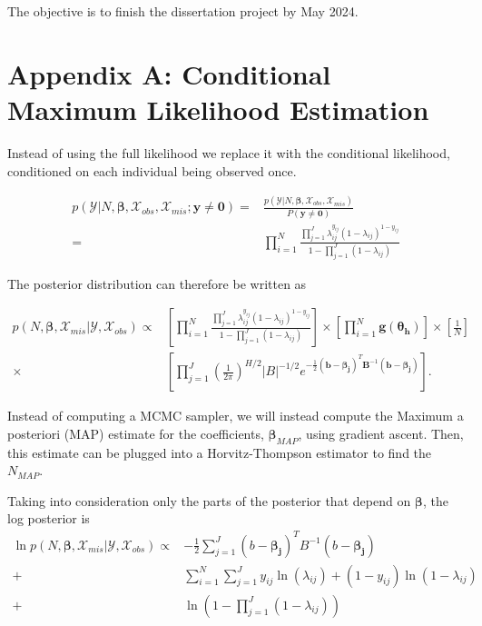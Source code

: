 \documentclass[
  12pt,
]{article}
\begin{document}
The objective is to finish the dissertation project by May 2024.

\newpage

\section{Appendix A: Conditional Maximum Likelihood Estimation}

\label{Sec:conditionalmaximumlike}

Instead of using the full likelihood we replace it with the conditional
likelihood, conditioned on each individual being observed once.

\begin{align}
\nonumber p(\mathcal{Y}|N,\boldsymbol{\beta},\mathcal{X}_{obs},\mathcal{X}_{mis};\boldsymbol{y}\ne \boldsymbol{0}) = & \frac{p(\mathcal{Y}|N,\boldsymbol{\beta},\mathcal{X}_{obs},\mathcal{X}_{mis})}{P(\boldsymbol{y}\ne \boldsymbol{0})} \\
= & \prod_{i=1}^N \frac{\prod_{j=1}^J \lambda_{ij}^{y_{ij}}(1-\lambda_{ij})^{1-y_{ij}}}{1-\prod_{j=1}^J(1-\lambda_{ij})}
\end{align}

The posterior distribution can therefore be written as

\begin{align}
\label{eqn:condposteriorderivevalues}
\nonumber p(N,\boldsymbol{\beta},\mathcal{X}_{mis}|\mathcal{Y},\mathcal{X}_{obs}) \propto &  \left[\prod_{i=1}^N \frac{\prod_{j=1}^J \lambda_{ij}^{y_{ij}}(1-\lambda_{ij})^{1-y_{ij}}}{1-\prod_{j=1}^J(1-\lambda_{ij})} \right] \times \left[ \prod_{i=1}^N \boldsymbol{g}(\boldsymbol{\theta_h}) \right] \times  \left[\frac{1}{N}\right] \\
\times & \left[ \prod_{j=1}^J \left(\frac{1}{2\pi}\right)^{H/2}|B|^{-1/2}e^{-\frac{1}{2}(\boldsymbol{b}-\boldsymbol{\beta_j})^T\boldsymbol{B}^{-1}(\boldsymbol{b}-\boldsymbol{\beta_j})}\right].
\end{align}

Instead of computing a MCMC sampler, we will instead compute the Maximum
a posteriori (MAP) estimate for the coefficients,
\(\boldsymbol{\beta}_{MAP}\), using gradient ascent. Then, this estimate
can be plugged into a Horvitz-Thompson estimator to find the
\(N_{MAP}\).

Taking into consideration only the parts of the posterior that depend on
\(\boldsymbol{\beta}\), the log posterior is \begin{align}
\nonumber \ln p(N,\boldsymbol{\beta},\mathcal{X}_{mis}|\mathcal{Y},\mathcal{X}_{obs}) \propto & -\frac{1}{2}\sum_{j=1}^J (b-\boldsymbol{\beta_j})^T B^{-1}(b-\boldsymbol{\beta_j}) \\
\nonumber + & \sum_{i=1}^N \sum_{j=1}^J y_{ij}\ln(\lambda_{ij}) + (1-y_{ij})\ln(1-\lambda_{ij}) \\ 
+  & \ln(1-\prod_{j=1}^J(1-\lambda_{ij}))
\end{align}
\end{document}
